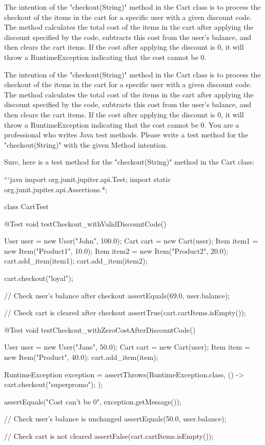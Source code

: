 \begin{answer}
The intention of the "checkout(String)" method in the Cart class is to process the checkout of the items in the cart for a specific user with a given discount code. The method calculates the total cost of the items in the cart after applying the discount specified by the code, subtracts this cost from the user's balance, and then clears the cart items. If the cost after applying the discount is 0, it will throw a RuntimeException indicating that the cost cannot be 0.
\end{answer}

\begin{prompt}
The intention of the "checkout(String)" method in the Cart class is to process the checkout of the items in the cart for a specific user with a given discount code. The method calculates the total cost of the items in the cart after applying the discount specified by the code, subtracts this cost from the user's balance, and then clears the cart items. If the cost after applying the discount is 0, it will throw a RuntimeException indicating that the cost cannot be 0.
You are a professional who writes Java test methods. Please write a test method for the "checkout(String)" with the given Method intention.  
\end{prompt}

\begin{answer}
Sure, here is a test method for the "checkout(String)" method in the Cart class:

```java
import org.junit.jupiter.api.Test;
import static org.junit.jupiter.api.Assertions.*;

class CartTest {

    @Test
    void testCheckout_withValidDiscountCode() {
        User user = new User("John", 100.0);
        Cart cart = new Cart(user);
        Item item1 = new Item("Product1", 10.0);
        Item item2 = new Item("Product2", 20.0);
        cart.add_item(item1);
        cart.add_item(item2);

        cart.checkout("loyal");

        // Check user's balance after checkout
        assertEquals(69.0, user.balance);

        // Check cart is cleared after checkout
        assertTrue(cart.cartItems.isEmpty());
    }

    @Test
    void testCheckout_withZeroCostAfterDiscountCode() {
        User user = new User("Jane", 50.0);
        Cart cart = new Cart(user);
        Item item = new Item("Product", 40.0);
        cart.add_item(item);

        RuntimeException exception = assertThrows(RuntimeException.class, () -> {
            cart.checkout("superpromo");
        });

        assertEquals("Cost can't be 0", exception.getMessage());

        // Check user's balance is unchanged
        assertEquals(50.0, user.balance);

        // Check cart is not cleared
        assertFalse(cart.cartItems.isEmpty());
    }
}
\end{answer}

